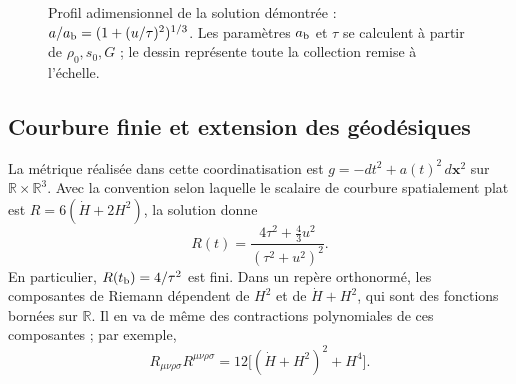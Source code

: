 \begin{figure}[htbp]
\centering
{}
\caption{Profil adimensionnel de la solution démontrée : \(a/a_{\rm b}=(1+(u/\tau)^2)^{1/3}\). Les paramètres \(a_{\rm b}\) et \(\tau\) se calculent à partir de \(\rho_0,s_0,G\) ; le dessin représente toute la collection remise à l'échelle.}
\label{vii:fig:rebote-polvo}
\end{figure}

\subsection{Courbure finie et extension des géodésiques}
La métrique réalisée dans cette coordinatisation est \(g=-dt^2+a(t)^2\,d\mathbf x^2\) sur \(\mathbb R\times\mathbb R^3\). Avec la convention selon laquelle le scalaire de courbure spatialement plat est \(R=6(\dot H+2H^2)\), la solution donne
\[
 R(t)=\frac{4\tau^2+\frac43u^2}{(\tau^2+u^2)^2}.
\]
En particulier, \(R(t_{\rm b})=4/\tau^2\) est fini.
Dans un repère orthonormé, les composantes de Riemann dépendent de
\(H^2\) et de \(\dot H+H^2\), qui sont des fonctions bornées sur
\(\mathbb R\). Il en va de même des contractions polynomiales
de ces composantes ; par exemple,
\[
 R_{\mu\nu\rho\sigma}R^{\mu\nu\rho\sigma}
 =12\bigl[(\dot H+H^2)^2+H^4\bigr].
\]

